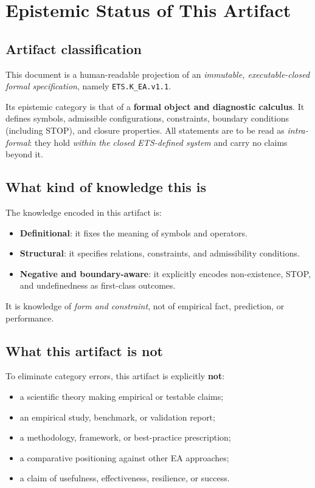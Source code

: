 
\section{Epistemic Status of This Artifact}
\label{sec:epistemic-status}

\subsection{Artifact classification}
This document is a human-readable projection of an \emph{immutable,
executable-closed formal specification}, namely
\texttt{ETS.K\_EA.v1.1}.

Its epistemic category is that of a \textbf{formal object and diagnostic
calculus}. It defines symbols, admissible configurations, constraints,
boundary conditions (including STOP), and closure properties.
All statements are to be read as \emph{intra-formal}: they hold
\emph{within the closed ETS-defined system} and carry no claims beyond it.

\subsection{What kind of knowledge this is}
The knowledge encoded in this artifact is:
\begin{itemize}
  \item \textbf{Definitional}: it fixes the meaning of symbols and operators.
  \item \textbf{Structural}: it specifies relations, constraints, and
        admissibility conditions.
  \item \textbf{Negative and boundary-aware}: it explicitly encodes
        non-existence, STOP, and undefinedness as first-class outcomes.
\end{itemize}

It is knowledge of \emph{form and constraint}, not of empirical fact,
prediction, or performance.

\subsection{What this artifact is not}
To eliminate category errors, this artifact is explicitly \textbf{not}:
\begin{itemize}
  \item a scientific theory making empirical or testable claims;
  \item an empirical study, benchmark, or validation report;
  \item a methodology, framework, or best-practice prescription;
  \item a comparative positioning against other EA approaches;
  \item a claim of usefulness, effectiveness, resilience, or success.
\end{itemize}

